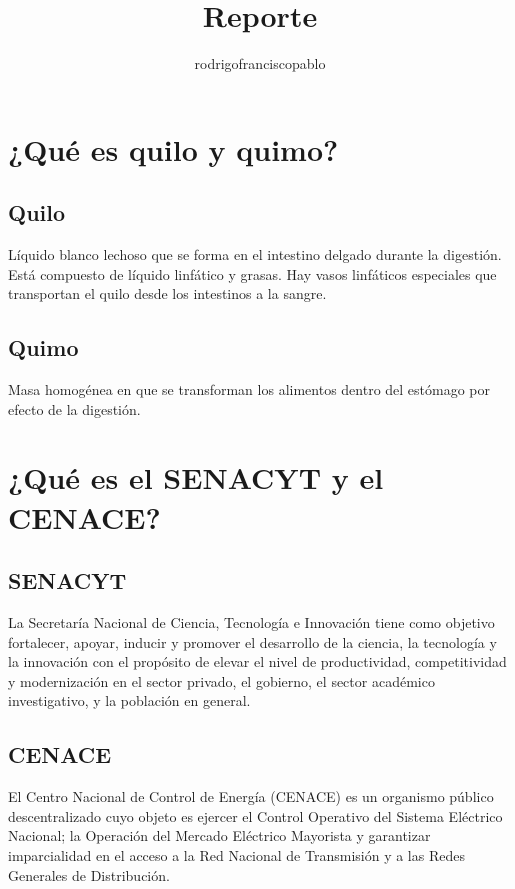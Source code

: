 \documentclass{mylib/reporte}
\title{Reporte}
\author{rodrigofranciscopablo }
\begin{document}
\coverPage

\tableofcontents

\section{¿Qué es quilo y quimo?}

\subsection{Quilo}

Líquido blanco lechoso que se forma en el intestino delgado durante la digestión. Está compuesto de líquido linfático y grasas. Hay vasos linfáticos especiales que transportan el quilo desde los intestinos a la sangre.

\subsection{Quimo}

Masa homogénea en que se transforman los alimentos dentro del estómago por efecto de la digestión.

\section{¿Qué es el SENACYT y el CENACE?}

\subsection{SENACYT}

La Secretaría Nacional de Ciencia, Tecnología e Innovación tiene como objetivo fortalecer, apoyar, inducir y promover el desarrollo de la ciencia, la tecnología y la innovación con el propósito de elevar el nivel de productividad, competitividad y modernización en el sector privado, el gobierno, el sector académico investigativo, y la población en general.

\subsection{CENACE}

El Centro Nacional de Control de Energía (CENACE) es un organismo público descentralizado cuyo objeto es ejercer el Control Operativo del Sistema Eléctrico Nacional; la Operación del Mercado Eléctrico Mayorista y garantizar imparcialidad en el acceso a la Red Nacional de Transmisión y a las Redes Generales de Distribución.
\end{document}
